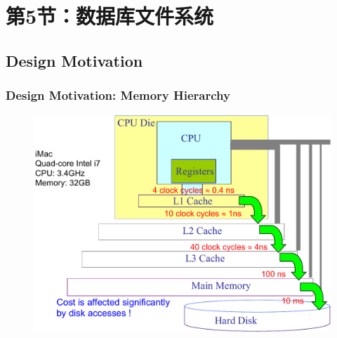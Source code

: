 \section{第5节：数据库文件系统} %
\subsection{Design Motivation} %

\begin{frame}[fragile]
    \frametitle{Design Motivation: Memory Hierarchy}
    \begin{figure}
        \includegraphics[width=0.6\linewidth]{figs/dbfile-mem-hierarchy.pdf}
    \end{figure}
\end{frame}

